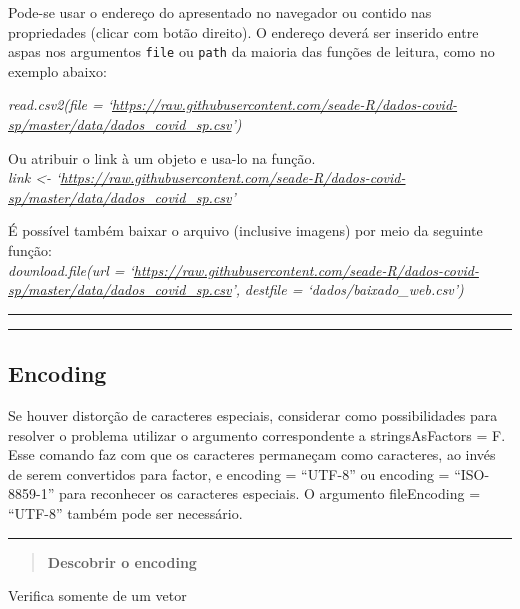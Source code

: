 \documentclass[
]{book}
\newenvironment{Shaded}{\begin{snugshade}}{\end{snugshade}}
\newcommand{\AttributeTok}[1]{\textcolor[rgb]{0.77,0.63,0.00}{#1}}
\newcommand{\DecValTok}[1]{\textcolor[rgb]{0.00,0.00,0.81}{#1}}
\newcommand{\FunctionTok}[1]{\textcolor[rgb]{0.00,0.00,0.00}{#1}}
\newcommand{\NormalTok}[1]{#1}
\newcommand{\SpecialCharTok}[1]{\textcolor[rgb]{0.00,0.00,0.00}{#1}}
\theoremstyle{definition}
\theoremstyle{definition}
\theoremstyle{definition}
\theoremstyle{definition}
\theoremstyle{remark}
\begin{document}
Pode-se usar o endereço do apresentado no navegador ou contido nas propriedades (clicar com botão direito). O endereço deverá ser inserido entre aspas nos argumentos \texttt{file} ou \texttt{path} da maioria das funções de leitura, como no exemplo abaixo:

\emph{read.csv2(file = `\url{https://raw.githubusercontent.com/seade-R/dados-covid-sp/master/data/dados_covid_sp.csv}')}

Ou atribuir o link à um objeto e usa-lo na função.\\
\emph{link \textless- `\url{https://raw.githubusercontent.com/seade-R/dados-covid-sp/master/data/dados_covid_sp.csv}'}

É possível também baixar o arquivo (inclusive imagens) por meio da seguinte função:\\
\emph{download.file(url = `\url{https://raw.githubusercontent.com/seade-R/dados-covid-sp/master/data/dados_covid_sp.csv}',}
\emph{destfile = `dados/baixado\_web.csv')}

\begin{center}\rule{0.5\linewidth}{0.5pt}\end{center}

\begin{center}\rule{0.5\linewidth}{0.5pt}\end{center}

\hypertarget{encoding}{%
\subsection{Encoding}\label{encoding}}

Se houver distorção de caracteres especiais, considerar como possibilidades para resolver o problema utilizar o argumento correspondente a stringsAsFactors = F. Esse comando faz com que os caracteres permaneçam como caracteres, ao invés de serem convertidos para factor, e encoding = ``UTF-8'' ou encoding = ``ISO-8859-1'' para reconhecer os caracteres especiais. O argumento fileEncoding = ``UTF-8'' também pode ser necessário.

\begin{center}\rule{0.5\linewidth}{0.5pt}\end{center}

\begin{quote}
\textbf{Descobrir o encoding}
\end{quote}

Verifica somente de um vetor

\begin{Shaded}
\end{Shaded}
\end{document}
